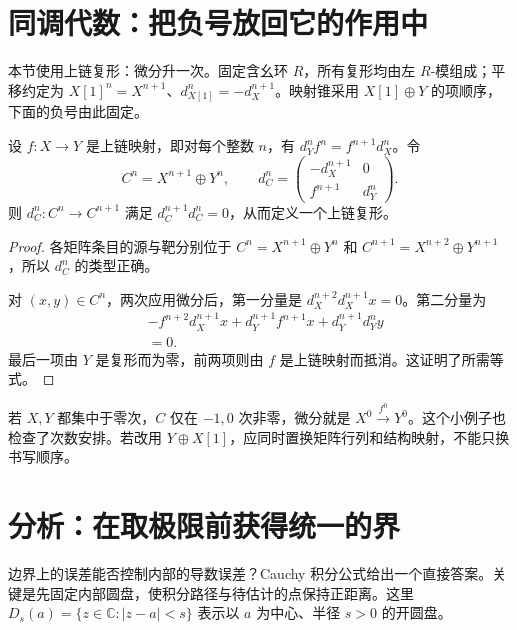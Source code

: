 \documentclass[11pt,a4paper,fontset=fandol,scheme=plain]{ctexart}
\begin{document}
\clearpage
\section{同调代数：把负号放回它的作用中}

本节使用上链复形：微分升一次。固定含幺环 $R$，所有复形均由左 $R$-模组成；平移约定为 $X[1]^n=X^{n+1}$、$d_{X[1]}^n=-d_X^{n+1}$。映射锥采用 $X[1]\oplus Y$ 的项顺序，下面的负号由此固定。

\begin{proposition}[映射锥的微分]\label{thm:cone-differential}

设 $f\colon X\to Y$ 是上链映射，即对每个整数 $n$，有 $d_Y^n f^n=f^{n+1}d_X^n$。令
\[
C^n=X^{n+1}\oplus Y^n,\qquad
 d_C^n=
\begin{pmatrix}
-d_X^{n+1}&0\\
f^{n+1}&d_Y^n
\end{pmatrix}.
\]
则 $d_C^n\colon C^n\to C^{n+1}$ 满足 $d_C^{n+1}d_C^n=0$，从而定义一个上链复形。

\end{proposition}

\begin{proof}

各矩阵条目的源与靶分别位于 $C^n=X^{n+1}\oplus Y^n$ 和 $C^{n+1}=X^{n+2}\oplus Y^{n+1}$，所以 $d_C^n$ 的类型正确。

对 $(x,y)\in C^n$，两次应用微分后，第一分量是 $d_X^{n+2}d_X^{n+1}x=0$。第二分量为
\[
\begin{aligned}
 &-f^{n+2}d_X^{n+1}x
   +d_Y^{n+1}f^{n+1}x
   +d_Y^{n+1}d_Y^n y\\
 &=0.
\end{aligned}
\]
最后一项由 $Y$ 是复形而为零，前两项则由 $f$ 是上链映射而抵消。这证明了所需等式。
\end{proof}

若 $X,Y$ 都集中于零次，$C$ 仅在 $-1,0$ 次非零，微分就是 $X^0\xrightarrow{f^0}Y^0$。这个小例子也检查了次数安排。若改用 $Y\oplus X[1]$，应同时置换矩阵行列和结构映射，不能只换书写顺序。



\clearpage
\section{分析：在取极限前获得统一的界}

边界上的误差能否控制内部的导数误差？Cauchy 积分公式给出一个直接答案。关键是先固定内部圆盘，使积分路径与待估计的点保持正距离。这里 $D_s(a)=\{z\in\mathbb C:|z-a|<s\}$ 表示以 $a$ 为中心、半径 $s>0$ 的开圆盘。
\end{document}
